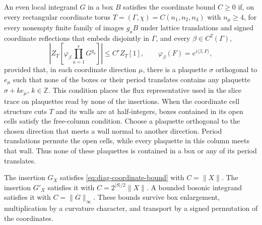 \documentclass[11pt,letterpaper,reqno]{amsart}
\newcommand{\Z}{\mathbb Z}
\begin{document}
An even local integrand $G$ in a box $B$ satisfies the coordinate
bound $C\ge0$ if, on every rectangular coordinate torus
$T=(\Gamma,\chi)=C(n_1,n_2,n_3)$ with $n_\mu\ge4$,
for every nonempty finite family of images $g_aB$ under lattice
translations and signed coordinate reflections that embeds
disjointly in $\Gamma$, and every $\beta\in C^2(\Gamma)$,
\begin{equation}\label{eq:diag-coordinate-bound}
 \left|Z_T\left[\varphi_\beta\prod_{a=1}^rG^{g_a}\right]\right|
       \le C^rZ_T[1],\qquad
       \varphi_\beta(F)=e^{i\langle\beta,F\rangle},
\end{equation}
provided that, in each coordinate direction $\mu$, there is a
plaquette $\sigma$ orthogonal to $e_\mu$ such that none of the
boxes or their period translates contains any plaquette
$\sigma+k e_\mu$, $k\in\Z$. This condition places the flux
representative used in the slice trace on plaquettes read by
none of the insertions.
When the coordinate cell structure cuts $T$ and its walls are at
half-integers, boxes contained in its open cells satisfy the
free-column condition. Choose a plaquette orthogonal to the chosen
direction that meets a wall normal to another direction.
Period translations permute the open cells, while every plaquette
in this column meets that wall. Thus none of these plaquettes
is contained in a box or any of its period translates.

\begin{proposition}\label{prop:diag-coordinate-insertions}
The insertion $G_X$ satisfies \eqref{eq:diag-coordinate-bound} with
$C=\|X\|$. The insertion $G'_X$ satisfies it with
$C=2^{|S|/2}\|X\|$. A bounded bosonic integrand satisfies it with
$C=\|G\|_\infty$. These bounds survive box enlargement,
multiplication by a curvature character, and transport by a
signed permutation of the coordinates.
\end{proposition}
\end{document}
